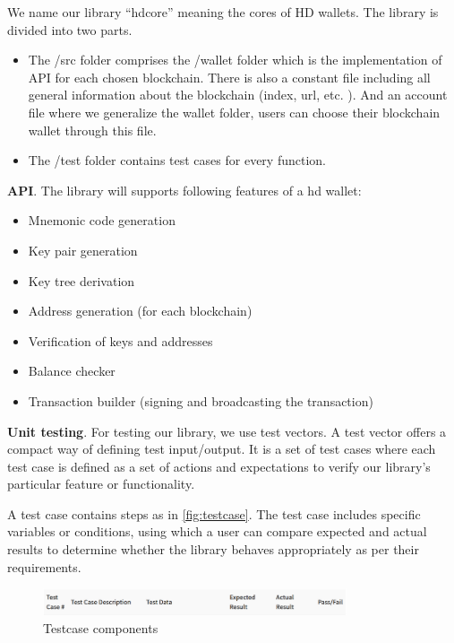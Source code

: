 We name our library “hdcore” meaning the cores of HD wallets. The library is divided into two parts.

\begin{itemize}
    \item The /src folder comprises the /wallet folder which is the implementation of API for each chosen blockchain. There is also a constant file including all general information about the blockchain (index, url, etc. ). And an account file where we generalize the wallet folder, users can choose their blockchain wallet through this file.
    \item The /test folder contains test cases for every function.
\end{itemize}

\bigskip
{\textbf{API}}. The library will supports following features of a hd wallet:

\begin{itemize}
    \item Mnemonic code generation
    \item Key pair generation
    \item Key tree derivation
    \item Address generation (for each blockchain)
    \item Verification of keys and addresses
    \item Balance checker
    \item Transaction builder (signing and broadcasting the transaction)
\end{itemize}


\bigskip
{\textbf{Unit testing}}. For testing our library, we use test vectors. A test vector offers a compact way of defining test input/output. It is a set of test cases where each test case is defined as a set of actions and expectations to verify our library's particular feature or functionality.

A test case contains steps as in \autoref{fig:testcase}. The test case includes specific variables or conditions, using which a user can compare expected and actual results to determine whether the library behaves appropriately as per their requirements.

\begin{figure}[!ht]
    \centering
    \includegraphics[width=0.8\textwidth]{images/testcase.png}
    \caption[Testcase components]{Testcase components}
    \label{fig:testcase}
\end{figure}

